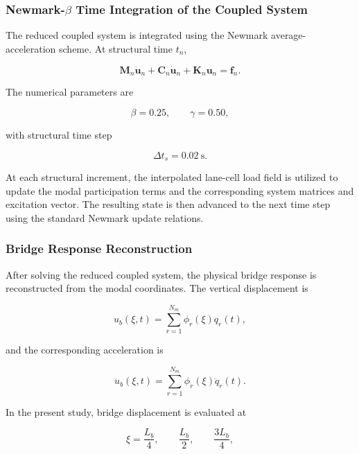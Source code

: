 \documentclass[journal]{IEEEtran}
\begin{document}
\subsubsection{Newmark-$\beta$ Time Integration of the Coupled System}

The reduced coupled
system is integrated using the Newmark average-acceleration scheme. At
structural time $t_n$,

\begin{equation}
\mathbf{M}_n\ddot{\mathbf{u}}_n
+
\mathbf{C}_n\dot{\mathbf{u}}_n
+
\mathbf{K}_n\mathbf{u}_n
=
\mathbf{f}_n.
\end{equation}

The numerical
parameters are

\begin{equation}
\beta = 0.25,
\qquad
\gamma = 0.50,
\end{equation}

with structural time
step

\begin{equation}
\Delta t_s = 0.02~\mathrm{s}.
\end{equation}

At each structural
increment, the interpolated lane-cell load field is utilized to update the
modal participation terms and the corresponding system matrices and excitation
vector. The resulting state is then advanced to the next time step using the
standard Newmark update relations.


\subsubsection{Bridge Response Reconstruction}

After solving the reduced coupled system, the physical bridge
response is reconstructed from the modal coordinates. The vertical displacement
is

\begin{equation}
u_b(\xi,t)
=
\sum_{r=1}^{N_m}
\phi_r(\xi)q_r(t),
\end{equation}

and the corresponding acceleration is

\begin{equation}
\ddot{u}_b(\xi,t)
=
\sum_{r=1}^{N_m}
\phi_r(\xi)\ddot{q}_r(t).
\end{equation}

In the present study, bridge displacement is evaluated at

\begin{equation}
\xi
=
\frac{L_b}{4},
\qquad
\frac{L_b}{2},
\qquad
\frac{3L_b}{4},
\end{equation}
\end{document}
